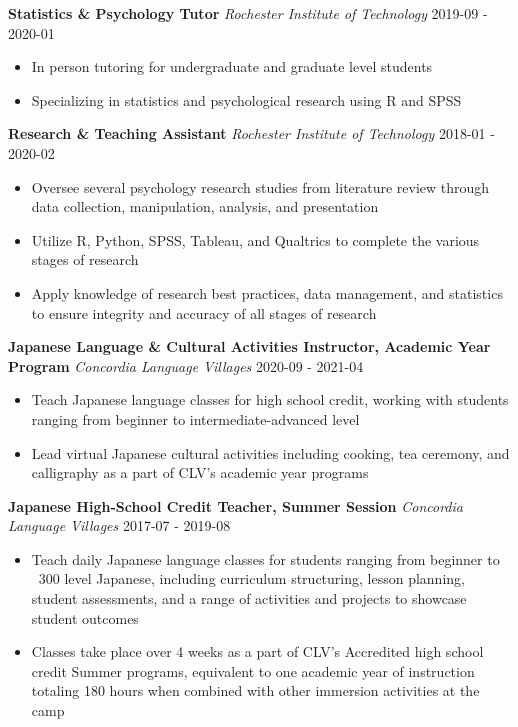 \documentclass[a4paper,9pt]{extarticle}
\begin{document}
\noindent
\textbf{Statistics \& Psychology Tutor}
\noindent
\textit{Rochester Institute of Technology} \hfill 2019-09 - 2020-01
\begin{itemize}

\item In person tutoring for undergraduate and graduate level students
\item Specializing in statistics and psychological research using R and SPSS
\end{itemize}

\noindent
\textbf{Research \& Teaching Assistant}
\noindent
\textit{Rochester Institute of Technology} \hfill 2018-01 - 2020-02
\begin{itemize}

\item Oversee several psychology research studies from literature review through data collection, manipulation, analysis, and presentation
\item Utilize R, Python, SPSS, Tableau, and Qualtrics to complete the various stages of research
\item Apply knowledge of research best practices, data management, and statistics to ensure integrity and accuracy of all stages of research
\end{itemize}

\noindent
\textbf{Japanese Language \& Cultural Activities Instructor, Academic Year Program}
\noindent
\textit{Concordia Language Villages} \hfill 2020-09 - 2021-04
\begin{itemize}

\item Teach Japanese language classes for high school credit, working with students ranging from beginner to intermediate-advanced level
\item Lead virtual Japanese cultural activities including cooking, tea ceremony, and calligraphy as a part of CLV's academic year programs
\end{itemize}

\noindent
\textbf{Japanese High-School Credit Teacher, Summer Session}
\noindent
\textit{Concordia Language Villages} \hfill 2017-07 - 2019-08
\begin{itemize}

\item Teach daily Japanese language classes for students ranging from beginner to ~300 level Japanese, including curriculum structuring, lesson planning, student assessments, and a range of activities and projects to showcase student outcomes
\item Classes take place over 4 weeks as a part of CLV's Accredited high school credit Summer programs, equivalent to one academic year of instruction totaling 180 hours when combined with other immersion activities at the camp
\end{itemize}
\end{document}
